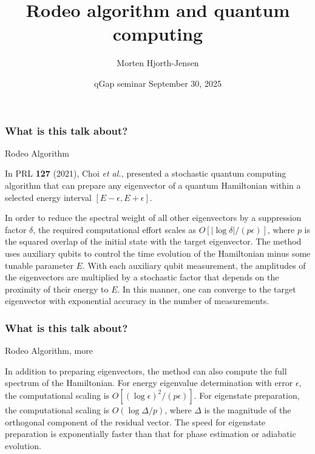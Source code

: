 \documentclass{beamer}
\begin{document}
\title[Quantum Computing and ML]{\textbf{Rodeo algorithm and quantum computing}}
\author{Morten Hjorth-Jensen}
\date{qGap seminar September 30, 2025}





\begin{frame}
\titlepage
\end{frame}

\begin{frame}
\frametitle{What is this talk about?}

\begin{block}{Rodeo Algorithm}

In PRL {\bf 127} (2021), Choi {\em et al.,} presented a stochastic
quantum computing algorithm that can prepare any eigenvector of a
quantum Hamiltonian within a selected energy interval $[E-\epsilon, E+\epsilon]$.

In order to reduce the spectral
weight of all other eigenvectors by a suppression factor $\delta$, the
required computational effort scales as $O[|\log \delta|/(p\epsilon)]$, where $p$ is the squared overlap of the initial state
with the target eigenvector. The method uses auxiliary qubits to control the time evolution of the
Hamiltonian minus some tunable parameter $E$. With each auxiliary
qubit measurement, the amplitudes of the eigenvectors are multiplied
by a stochastic factor that depends on the proximity of their energy
to $E$. In this manner, one can converge to the target eigenvector with
exponential accuracy in the number of measurements.

\end{block}

\end{frame}

\begin{frame}
\frametitle{What is this talk about?}

\begin{block}{Rodeo Algorithm, more}

In addition to
preparing eigenvectors, the method can also compute the full spectrum
of the Hamiltonian.  For energy eigenvalue determination with error $\epsilon$,
the computational scaling is $O[(\log \epsilon)^2/(p \epsilon)]$.  For
eigenstate preparation, the computational scaling is $O(\log \Delta/p)$, where $\Delta$ is the magnitude of the orthogonal
component of the residual vector.  The speed for eigenstate
preparation is exponentially faster than that for phase estimation or
adiabatic evolution.
\end{block}

\end{frame}
\end{document}
